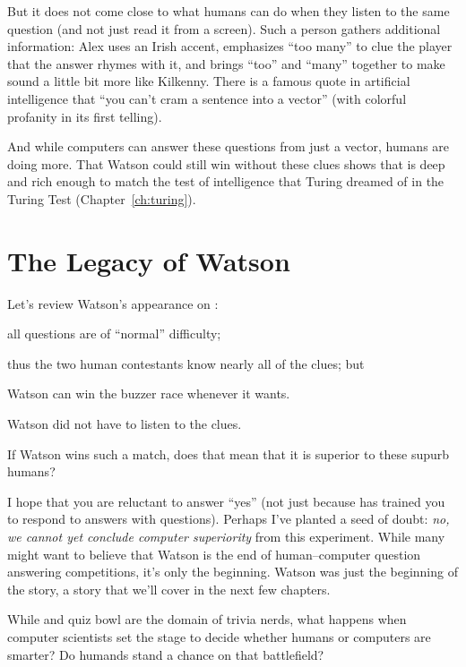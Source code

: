 But it does not come close to what humans can do when they listen to
the same question (and not just read it from a screen).
% 
Such a person gathers additional
information: Alex uses an Irish accent, emphasizes ``too many'' to
clue the player that the answer rhymes with it, and brings ``too'' and
``many'' together to make sound a little bit more like Kilkenny.
%
There is a famous quote in artificial intelligence that ``you can't
cram a sentence into a vector'' (with colorful profanity in its first
telling).

And while computers can answer these questions from just a vector,
humans are doing more.
%
That Watson could still win without these clues shows that \jeopardy{}
is deep and rich enough to match the test of intelligence that Turing
dreamed of in the Turing Test (Chapter~\ref{ch:turing}).

\section{The Legacy of Watson}

Let's review Watson's appearance on \jeopardyp{}:
\begin{enumerate*}
        \item all questions are of ``normal'' difficulty;
        \item thus the two human contestants know nearly all of the clues; but
        \item Watson can win the buzzer race whenever it wants.
        \item Watson did not have to listen to the clues.
\end{enumerate*}
If Watson wins such a match, does that mean that it is superior to
these supurb humans?

I hope that you are reluctant to answer ``yes'' (not just
because \jeopardy{} has trained you to respond to answers with
questions).
%
Perhaps I've planted a seed of doubt: \emph{no, we cannot yet conclude
  computer superiority} from this experiment.
%
While many might want to believe that Watson is the end of
human--computer question answering competitions, it's only the
beginning.
%
Watson was
just the beginning of the story, a story that we'll cover in the next
few chapters.

While \jeopardy{} and quiz bowl are the domain of trivia nerds, what
happens when computer scientists set the stage to decide whether
humans or computers are smarter?
%
Do humands stand a chance on that battlefield?
